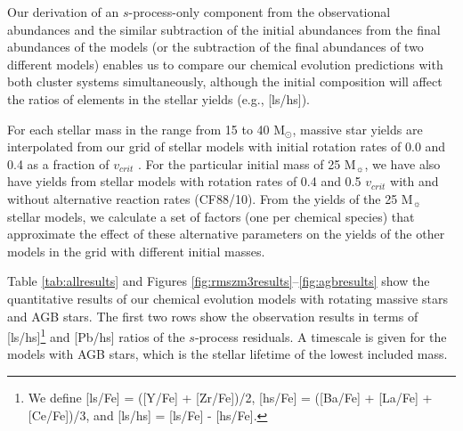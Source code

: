 Our derivation of an $s$-process-only component from the observational abundances and the similar subtraction of the initial abundances from the final abundances of the models (or the subtraction of the final abundances of two different models) enables us to compare our chemical evolution predictions with both cluster systems simultaneously, although the initial composition will affect the ratios of elements in the stellar yields (e.g., [ls/hs]).

For each stellar mass in the range from 15 to 40 M$_\odot$, massive star yields are interpolated from our grid of stellar models with initial rotation rates of 0.0 and 0.4 as a fraction of $v_{crit}$ \citep{Frischknecht:2012il}. For the particular initial mass of 25 M$_\sun$, we have also have yields from stellar models with rotation rates of 0.4 and 0.5 $v_{crit}$ with and without alternative reaction rates (CF88/10). From the yields of the 25 M$_\sun$ stellar models, we calculate a set of factors (one per chemical species) that approximate the effect of these alternative parameters on the yields of the other models in the grid with different initial masses. 

Table \ref{tab:allresults} and Figures \ref{fig:rmszm3results}--\ref{fig:agbresults} show the quantitative results of our chemical evolution models with rotating massive stars and AGB stars. The first two rows show the observation results in terms of [ls/hs]\footnote{We define [ls/Fe] = ([Y/Fe] + [Zr/Fe])/2, [hs/Fe] = ([Ba/Fe] + [La/Fe] + [Ce/Fe])/3, and [ls/hs] = [ls/Fe] - [hs/Fe].} and [Pb/hs] ratios of the $s$-process residuals. A timescale is given for the models with AGB stars, which is the stellar lifetime of the lowest included mass.

